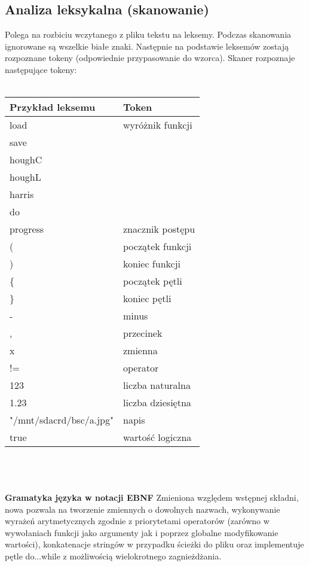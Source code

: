 \documentclass[11pt,a4paper]{article}
\begin{document}
\subsection{Analiza leksykalna (skanowanie)}
Polega na rozbiciu wczytanego z pliku tekstu na leksemy. Podczas skanowania ignorowane są wszelkie białe znaki. Następnie na podstawie leksemów zostają rozpoznane tokeny (odpowiednie przypasowanie do wzorca). Skaner rozpoznaje następujące tokeny:\\\\
\begin{tabular}{ | l | l | }
\hline                        
\bf{Przykład leksemu} & \bf{Token} \\\hline        
load & wyróżnik funkcji \\
save&\\
houghC&\\
houghL&\\
harris&\\
do&\\
\hline
progress& znacznik postępu\\\hline
( & początek funkcji\\\hline
) & koniec funkcji\\\hline
\{ & początek pętli \\\hline
\} & koniec pętli \\\hline
- & minus \\\hline
, & przecinek\\\hline
x & zmienna\\\hline
!= & operator\\\hline
123 & liczba naturalna\\\hline
1.23 & liczba dziesiętna\\\hline
"/mnt/sdacrd/bsc/a.jpg" & napis\\\hline
true & wartość logiczna\\\hline
\end{tabular}
\\\\\\
{\bf Gramatyka języka w notacji EBNF}\label{gramatyka}
Zmieniona względem wstępnej składni, nowa pozwala na tworzenie zmiennych o dowolnych nazwach, wykonywanie wyrażeń arytmetycznych zgodnie z priorytetami operatorów (zarówno w wywołaniach funkcji jako argumenty jak i poprzez globalne modyfikowanie wartości), konkatenacje stringów w przypadku ścieżki do pliku oraz implementuje pętle do...while z możliwością wielokrotnego zagnieżdżania.
\end{document}
